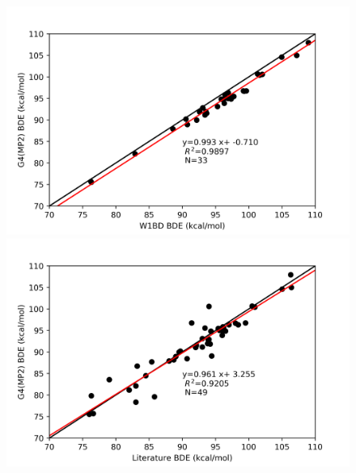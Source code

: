 \begin{figure}
\centering
\begin{minipage}{8cm}
  \centering
  \includegraphics[width=\textwidth]{figures/w1bd-g4mp2}
\end{minipage}%
\begin{minipage}{8cm}
  \centering
  \includegraphics[width=\textwidth]{figures/lit-g4mp2}
\end{minipage}
\end{figure}

\begin{landscape}

\end{landscape}


